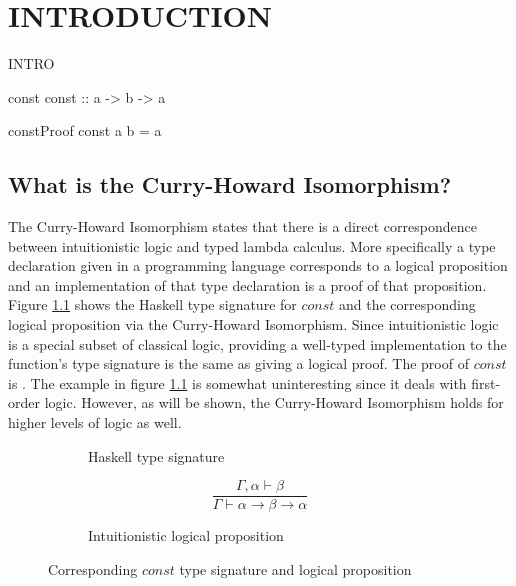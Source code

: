 \chapter{INTRODUCTION}\label{ch:intro}
INTRO

\begin{SaveVerbatim}{const}
const :: a -> b -> a
\end{SaveVerbatim}

\begin{SaveVerbatim}{constProof}
const a b = a
\end{SaveVerbatim}

\section{What is the Curry-Howard Isomorphism?}
The Curry-Howard Isomorphism states that there is a direct correspondence between intuitionistic logic and typed lambda calculus. More specifically a type declaration given in a programming language corresponds to a logical proposition and an implementation of that type declaration is a proof of that proposition. Figure \ref{fig:const} shows the Haskell type signature for $const$ and the corresponding logical proposition via the Curry-Howard Isomorphism. Since intuitionistic logic is a special subset of classical logic, providing a well-typed implementation to the function's type signature is the same as giving a logical proof. The proof of $const$ is . The example in figure \ref{fig:const} is somewhat uninteresting since it deals with first-order logic. However, as will be shown, the Curry-Howard Isomorphism holds for higher levels of logic as well.

\begin{figure}
  \begin{subfigure}[b]{.5\linewidth}
    \vspace{.2in}
    \caption{Haskell type signature}
  \end{subfigure}
  \begin{subfigure}[b]{.5\linewidth}
    \centering
    \begin{equation*}
    \frac{\Gamma, \alpha \vdash \beta}{\Gamma \vdash \alpha \rightarrow \beta \rightarrow \alpha}
    \end{equation*}
    \caption{Intuitionistic logical proposition}
  \end{subfigure}
  \caption{Corresponding $const$ type signature and logical proposition}
  \label{fig:const}
\end{figure}

